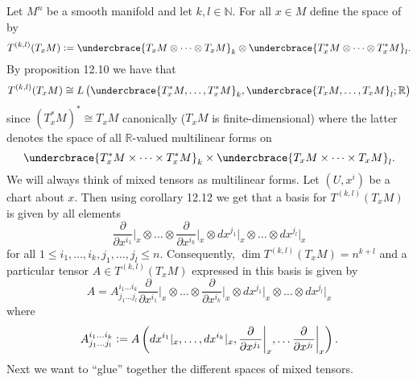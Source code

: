 Let $M^n$ be a smooth manifold and let $k,l \in \mathbb{N}$. For all $x \in M$ define the space of  by
\begin{equation*}
	T^{(k,l)}(T_xM) := \undercbrace{T_xM \otimes \dots \otimes T_xM}_{k} \otimes \undercbrace{T^*_xM \otimes \dots \otimes T^*_xM}_{l}.
\end{equation*}
By proposition 12.10 \cite[311]{lee:smooth_manifolds:2013} we have that 
\begin{equation*}
	T^{(k,l)}(T_xM) \cong L\del[1]{\undercbrace{T^*_xM, \dots, T^*_xM}_{k},\undercbrace{T_xM,\dots,T_xM}_{l};\mathbb{R}}
\end{equation*}
\noindent since $(T^*_xM)^* \cong T_xM$ canonically ($T_xM$ is finite-dimensional) where the latter denotes the space of all $\mathbb{R}$-valued multilinear forms on
\begin{equation*}
	\undercbrace{T^*_xM \times \dots \times T^*_xM}_{k} \times \undercbrace{T_xM \times \dots \times T_xM}_{l}.
\end{equation*}
We will always think of mixed tensors as multilinear forms. Let $(U,x^i)$ be a chart about $x$. Then using corollary 12.12 \cite[313]{lee:smooth_manifolds:2013} we get that a basis for $T^{(k,l)}(T_xM)$ is given by all elements 
\begin{equation*}
	\frac{\partial}{\partial x^{i_1}}\bigg\vert_x \otimes \dots \otimes \frac{\partial}{\partial x^{i_k}}\bigg\vert_x \otimes dx^{j_1}\vert_x \otimes \dots \otimes dx^{j_l}\vert_x
\end{equation*}
\noindent for all $1 \leq i_1,\dots,i_k,j_1,\dots,j_l \leq n$. Consequently, $\dim T^{(k,l)}(T_xM) = n^{k + l}$ and a particular tensor $A \in T^{(k,l)}(T_xM)$ expressed in this basis is given by 
\begin{equation}
	\label{eq:tensor_expression_basis}
	A = A^{i_1\dots i_k}_{j_1\dots j_l}\frac{\partial}{\partial x^{i_1}}\bigg\vert_x \otimes \dots \otimes \frac{\partial}{\partial x^{i_k}}\bigg\vert_x \otimes dx^{j_1}\vert_x \otimes \dots \otimes dx^{j_l}\vert_x
\end{equation}
\noindent where
\begin{equation}
	\label{eq:tensor_components}
	A^{i_1\dots i_k}_{j_1\dots j_l} := A\del[3]{dx^{i_1}\vert_x,\dots,dx^{i_k}\vert_x,\frac{\partial}{\partial x^{j_1}}\bigg\vert_x,\dots\frac{\partial}{\partial x^{j_l}}\bigg\vert_x}.
\end{equation}
 Next we want to ``glue'' together the different spaces of mixed tensors.

